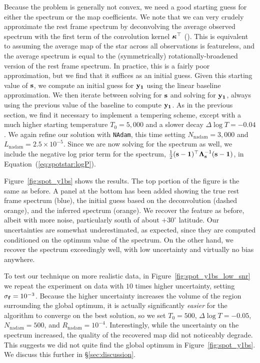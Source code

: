 \documentclass[modern]{aastex62}
\begin{document}
Because the problem is generally not convex, we need a good starting
guess for either the spectrum or the map coefficients. We note that
we can very crudely approximate the rest frame spectrum by deconvolving the
average observed spectrum with the first term of the convolution kernel
$\boldsymbol{\kappa}^\top$ (). %
This is equivalent to assuming the average map of the star
across all observations is featureless, and the average spectrum is equal
to the (symmetrically) rotationally-broadened version of the rest frame
spectrum. In practice, this is a fairly poor approximation, but we find that it
suffices as an initial guess. Given this starting value of ${\mathbf{s}}$, we
compute an initial guess for ${\mathbf{y_1}}$ using the linear baseline
approximation. We then iterate between solving for ${\mathbf{s}}$ and
solving for ${\mathbf{y_1}}$, always using the previous value of the
baseline to compute ${\mathbf{y_1}}$. As in the previous section, we find it
necessary to implement a tempering scheme, except with a much higher
starting temperature $T_0 = 5,000$ and a slower decay $\Delta\log T = -0.04$.
We again refine our solution with \texttt{NAdam}, this time setting
$N_\mathrm{nadam} = 3,000$ and $L_\mathrm{nadam} = 2.5\times 10^{-5}$. Since
we are now solving for the spectrum as well, we include the negative log prior
term for the spectrum,
$\frac{1}{2}({\mathbf{s - 1}})^\top \boldsymbol{\Lambda}_{\mathbf{s}}^{-1}({\mathbf{s - 1}})$,
in Equation~(\ref{eq:spotstar:logP}).

Figure~\ref{fig:spot_y1bs} shows the results. The top portion of the figure is
the same as before. A panel at the bottom has been added showing the true
rest frame spectrum (blue), the initial guess based on the deconvolution
(dashed orange), and the inferred spectrum (orange). We recover the \spot
feature as before, albeit with more noise, particularly south of about
$+30^\circ$ latitude. Our uncertainties are somewhat underestimated, as
expected, since they are computed conditioned on the optimum value of
the spectrum. On the other hand, we recover the spectrum exceedingly well,
with low uncertainty and virtually no bias anywhere.

To test our technique on more realistic data, in Figure~\ref{fig:spot_y1bs_low_snr}
we repeat the experiment on data with $10$ times higher uncertainty,
setting $\sigma_{\mathbf{f}} = 10^{-3}$. Because the higher uncertainty increases
the volume of the region surrounding the global optimum, it is
actually significantly \emph{easier} for the algorithm to converge on the
best solution, so we set $T_0 = 500$, $\Delta\log T = -0.05$,
$N_\mathrm{nadam} = 500$, and $R_\mathrm{nadam} = 10^{-4}$. Interestingly,
while the uncertainty on the spectrum increased, the quality of the
recovered \spot map did not noticeably degrade. This suggests we did not
quite find the global optimum in Figure~\ref{fig:spot_y1bs}. We discuss
this further in \S\ref{sec:discussion}.
\end{document}
